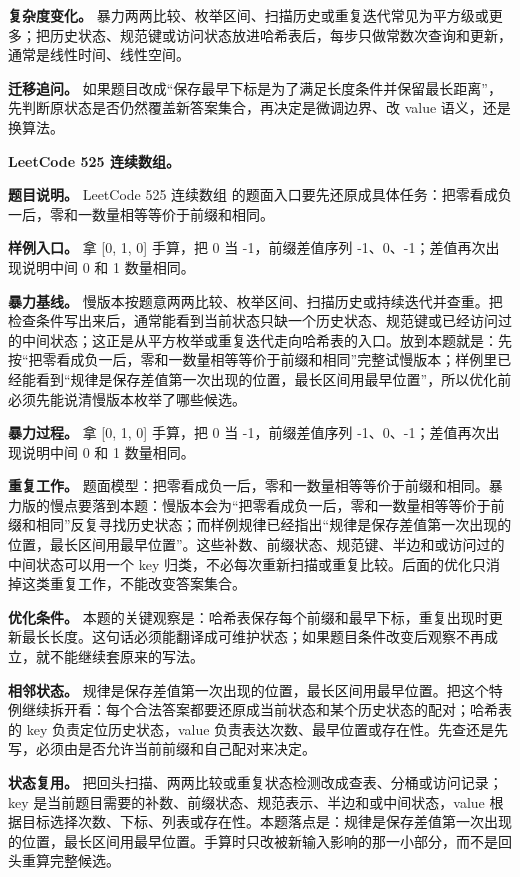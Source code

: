 \textbf{复杂度变化。} 暴力两两比较、枚举区间、扫描历史或重复迭代常见为平方级或更多；把历史状态、规范键或访问状态放进哈希表后，每步只做常数次查询和更新，通常是线性时间、线性空间。

\textbf{迁移追问。} 如果题目改成“保存最早下标是为了满足长度条件并保留最长距离”，先判断原状态是否仍然覆盖新答案集合，再决定是微调边界、改 value 语义，还是换算法。

\noindent\textbf{LeetCode 525 连续数组。}

\textbf{题目说明。} LeetCode 525 连续数组 的题面入口要先还原成具体任务：把零看成负一后，零和一数量相等等价于前缀和相同。

\textbf{样例入口。} 拿 [0, 1, 0] 手算，把 0 当 -1，前缀差值序列 -1、0、-1；差值再次出现说明中间 0 和 1 数量相同。

\textbf{暴力基线。} 慢版本按题意两两比较、枚举区间、扫描历史或持续迭代并查重。把检查条件写出来后，通常能看到当前状态只缺一个历史状态、规范键或已经访问过的中间状态；这正是从平方枚举或重复迭代走向哈希表的入口。放到本题就是：先按“把零看成负一后，零和一数量相等等价于前缀和相同”完整试慢版本；样例里已经能看到“规律是保存差值第一次出现的位置，最长区间用最早位置”，所以优化前必须先能说清慢版本枚举了哪些候选。

\textbf{暴力过程。} 拿 [0, 1, 0] 手算，把 0 当 -1，前缀差值序列 -1、0、-1；差值再次出现说明中间 0 和 1 数量相同。

\textbf{重复工作。} 题面模型：把零看成负一后，零和一数量相等等价于前缀和相同。暴力版的慢点要落到本题：慢版本会为“把零看成负一后，零和一数量相等等价于前缀和相同”反复寻找历史状态；而样例规律已经指出“规律是保存差值第一次出现的位置，最长区间用最早位置”。这些补数、前缀状态、规范键、半边和或访问过的中间状态可以用一个 key 归类，不必每次重新扫描或重复比较。后面的优化只消掉这类重复工作，不能改变答案集合。

\textbf{优化条件。} 本题的关键观察是：哈希表保存每个前缀和最早下标，重复出现时更新最长长度。这句话必须能翻译成可维护状态；如果题目条件改变后观察不再成立，就不能继续套原来的写法。

\textbf{相邻状态。} 规律是保存差值第一次出现的位置，最长区间用最早位置。把这个特例继续拆开看：每个合法答案都要还原成当前状态和某个历史状态的配对；哈希表的 key 负责定位历史状态，value 负责表达次数、最早位置或存在性。先查还是先写，必须由是否允许当前前缀和自己配对来决定。

\textbf{状态复用。} 把回头扫描、两两比较或重复状态检测改成查表、分桶或访问记录；key 是当前题目需要的补数、前缀状态、规范表示、半边和或中间状态，value 根据目标选择次数、下标、列表或存在性。本题落点是：规律是保存差值第一次出现的位置，最长区间用最早位置。手算时只改被新输入影响的那一小部分，而不是回头重算完整候选。

